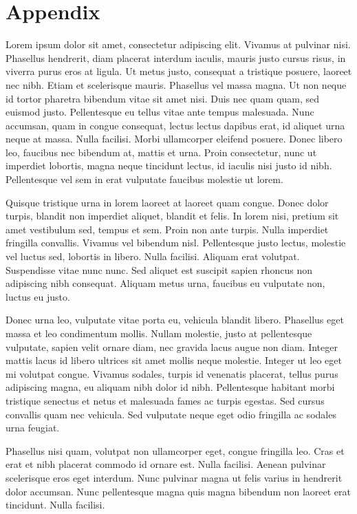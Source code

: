 \chapter{Appendix}

Lorem ipsum dolor sit amet, consectetur adipiscing elit. Vivamus at pulvinar nisi. Phasellus hendrerit, diam placerat interdum iaculis, mauris justo cursus risus, in viverra purus eros at ligula. Ut metus justo, consequat a tristique posuere, laoreet nec nibh. Etiam et scelerisque mauris. Phasellus vel massa magna. Ut non neque id tortor pharetra bibendum vitae sit amet nisi. Duis nec quam quam, sed euismod justo. Pellentesque eu tellus vitae ante tempus malesuada. Nunc accumsan, quam in congue consequat, lectus lectus dapibus erat, id aliquet urna neque at massa. Nulla facilisi. Morbi ullamcorper eleifend posuere. Donec libero leo, faucibus nec bibendum at, mattis et urna. Proin consectetur, nunc ut imperdiet lobortis, magna neque tincidunt lectus, id iaculis nisi justo id nibh. Pellentesque vel sem in erat vulputate faucibus molestie ut lorem.

Quisque tristique urna in lorem laoreet at laoreet quam congue. Donec dolor turpis, blandit non imperdiet aliquet, blandit et felis. In lorem nisi, pretium sit amet vestibulum sed, tempus et sem. Proin non ante turpis. Nulla imperdiet fringilla convallis. Vivamus vel bibendum nisl. Pellentesque justo lectus, molestie vel luctus sed, lobortis in libero. Nulla facilisi. Aliquam erat volutpat. Suspendisse vitae nunc nunc. Sed aliquet est suscipit sapien rhoncus non adipiscing nibh consequat. Aliquam metus urna, faucibus eu vulputate non, luctus eu justo.

Donec urna leo, vulputate vitae porta eu, vehicula blandit libero. Phasellus eget massa et leo condimentum mollis. Nullam molestie, justo at pellentesque vulputate, sapien velit ornare diam, nec gravida lacus augue non diam. Integer mattis lacus id libero ultrices sit amet mollis neque molestie. Integer ut leo eget mi volutpat congue. Vivamus sodales, turpis id venenatis placerat, tellus purus adipiscing magna, eu aliquam nibh dolor id nibh. Pellentesque habitant morbi tristique senectus et netus et malesuada fames ac turpis egestas. Sed cursus convallis quam nec vehicula. Sed vulputate neque eget odio fringilla ac sodales urna feugiat.

Phasellus nisi quam, volutpat non ullamcorper eget, congue fringilla leo. Cras et erat et nibh placerat commodo id ornare est. Nulla facilisi. Aenean pulvinar scelerisque eros eget interdum. Nunc pulvinar magna ut felis varius in hendrerit dolor accumsan. Nunc pellentesque magna quis magna bibendum non laoreet erat tincidunt. Nulla facilisi.

